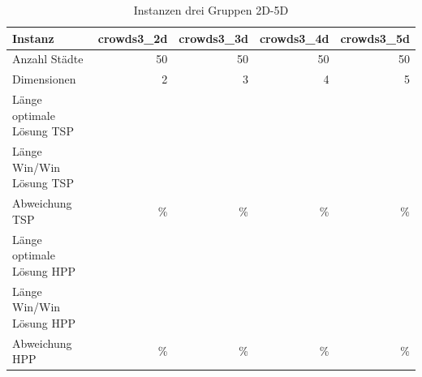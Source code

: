 \documentclass[11pt,a4paper]{article}
\begin{document}
\begin{table}[H]
        \centering
        \begin{tabular}{| l | r | r | r | r |}
            \hline
            Instanz                     & \textbf{crowds3\_2d}     
                                        & \textbf{crowds3\_3d}     
                                        & \textbf{crowds3\_4d}     
                                        & \textbf{crowds3\_5d}             \\ \hline
                Anzahl Städte               & 50        & 50       & 50         & 50        \\ \hline
                Dimensionen                 & 2         & 3        & 4          & 5         \\ \hline
                Länge optimale Lösung TSP   &           &          &            &           \\ \hline
                Länge Win/Win Lösung  TSP   &           &          &            &           \\ \hline
                Abweichung TSP              &     \%    &      \%  &      \%    &      \%   \\ \hline
                Länge optimale Lösung HPP   &           &          &            &           \\ \hline
                Länge Win/Win Lösung  HPP   &           &          &            &           \\ \hline
                Abweichung HPP              &     \%    &     \%   &     \%     &      \%   \\ \hline
        \end{tabular}
        \caption{Instanzen drei Gruppen 2D-5D}
        \label{tab:instanzen_crowds3}
\end{table}
\end{document}
